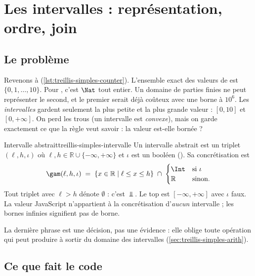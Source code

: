 \section{Les intervalles : représentation, ordre, join}
\label{sec:treillis-simples-intervalles}

\subsection{Le problème}

Revenons à  (\cref{lst:treillis-simples-counter}). L'ensemble
exact des valeurs de  est $\{0, 1, \dots, 10\}$. Pour
, c'est $\Nat$ tout entier. Un domaine de parties finies ne
peut représenter le second, et le premier serait déjà coûteux avec une borne
à $10^6$. Les \emph{intervalles} gardent seulement la plus petite et la plus
grande valeur : $[0, 10]$ et $[0, +\infty]$. On perd les trous (un intervalle
est \emph{convexe}), mais on garde exactement ce que la règle
 veut savoir : la valeur est-elle bornée ?

\begin{definition}{Intervalle abstrait}{treillis-simples-intervalle}
  Un intervalle abstrait est un triplet $(\ell, h, \iota)$ où
  $\ell, h \in \mathbb{R} \cup \{-\infty, +\infty\}$ et $\iota$ est un
  booléen (). Sa concrétisation est
  \[
    \gam(\ell, h, \iota) \;=\; \{ x \in \mathbb{R} \mid \ell \le x \le h \}
    \;\cap\; \begin{cases} \Int & \text{si } \iota \\ \mathbb{R} & \text{sinon.}\end{cases}
  \]
  Tout triplet avec $\ell > h$ dénote $\emptyset$ : c'est $\Bot$. Le top est
  $[-\infty, +\infty]$ avec $\iota$ faux. La valeur JavaScript 
  n'appartient à la concrétisation d'\emph{aucun} intervalle ; les bornes
  infinies signifient \og pas de borne\fg{}.
\end{definition}

La dernière phrase est une décision, pas une évidence : elle oblige toute
opération qui peut produire  à sortir du domaine des intervalles
(\cref{sec:treillis-simples-arith}).

\subsection{Ce que fait le code}

